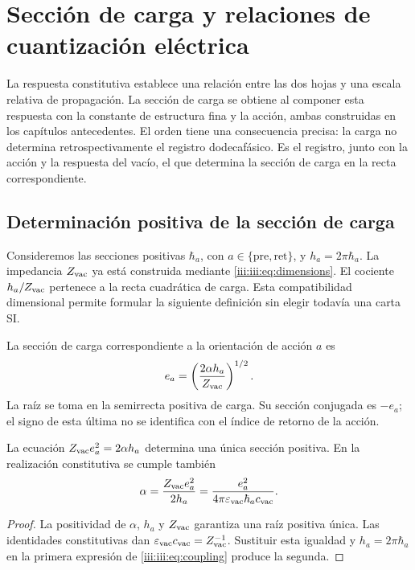 \section{Sección de carga y relaciones de cuantización eléctrica}
\label{iii:iii:sec:carga}

La respuesta constitutiva establece una relación entre las dos hojas y una
escala relativa de propagación. La sección de carga se obtiene al componer
esta respuesta con la constante de estructura fina y la acción, ambas
construidas en los capítulos antecedentes. El orden tiene una consecuencia
precisa: la carga no determina retrospectivamente el registro dodecafásico.
Es el registro, junto con la acción y la respuesta del vacío, el que
determina la sección de carga en la recta correspondiente.

\subsection{Determinación positiva de la sección de carga}

Consideremos las secciones positivas $\hbar_a$, con
$a\in\{\mathrm{pre},\mathrm{ret}\}$, y $h_a=2\pi\hbar_a$.
La impedancia $Z_{\rm vac}$ ya está construida mediante
\eqref{iii:iii:eq:dimensions}. El cociente $h_a/Z_{\rm vac}$ pertenece a
la recta cuadrática de carga. Esta compatibilidad dimensional permite
formular la siguiente definición sin elegir todavía una carta SI.

\begin{definition}
La sección de carga correspondiente a la orientación de acción $a$ es
\begin{equation}
 e_a=\left(\frac{2\alpha h_a}{Z_{\rm vac}}\right)^{1/2}.
 \label{iii:iii:eq:charge}
\end{equation}
La raíz se toma en la semirrecta positiva de carga. Su sección conjugada
es $-e_a$; el signo de esta última no se identifica con el índice de
retorno de la acción.
\end{definition}

\begin{proposition}
La ecuación $Z_{\rm vac}e_a^2=2\alpha h_a$ determina una única sección
positiva. En la realización constitutiva se cumple también
\begin{equation}
 \alpha=\frac{Z_{\rm vac}e_a^2}{2h_a}
 =\frac{e_a^2}{4\pi\varepsilon_{\rm vac}\hbar_a c_{\rm vac}}.
 \label{iii:iii:eq:coupling}
\end{equation}
\end{proposition}
\begin{proof}
La positividad de $\alpha$, $h_a$ y $Z_{\rm vac}$ garantiza una raíz
positiva única. Las identidades constitutivas dan
$\varepsilon_{\rm vac}c_{\rm vac}=Z_{\rm vac}^{-1}$.
Sustituir esta igualdad y $h_a=2\pi\hbar_a$ en la primera expresión
de \eqref{iii:iii:eq:coupling} produce la segunda.
\end{proof}

